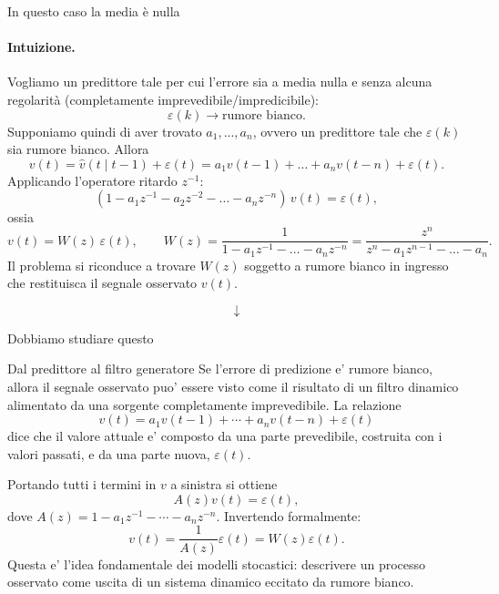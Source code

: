 \documentclass[11pt,a4paper]{article}
\begin{document}
In questo caso la media è nulla


\paragraph{Intuizione.} Vogliamo un predittore tale per cui l'errore sia a media nulla e senza alcuna regolarità (completamente imprevedibile/impredicibile):
\[
\varepsilon(k)\longrightarrow \text{rumore bianco}.
\]
Supponiamo quindi di aver trovato $a_1,...,a_n$, ovvero un predittore tale che $\varepsilon(k)$ sia rumore bianco. Allora
\[
v(t)=\hat v(t\mid t-1)+\varepsilon(t)=a_1 v(t-1)+\dots+a_n v(t-n)+\varepsilon(t).
\]
Applicando l'operatore ritardo $z^{-1}$:
\[
(1-a_1 z^{-1}-a_2 z^{-2}-\dots-a_n z^{-n})\,v(t)=\varepsilon(t),
\]
ossia
\[
v(t)=W(z)\,\varepsilon(t),\qquad W(z)=\frac{1}{1-a_1 z^{-1}-\dots-a_n z^{-n}}=\frac{z^n}{z^n-a_1 z^{n-1}-\dots-a_n}.
\]
Il problema si riconduce a trovare $W(z)$ soggetto a rumore bianco in ingresso che restituisca il segnale osservato $v(t)$.

\begin{center}
\end{center}
\vspace{-0.8em}
\[
\downarrow
\]
\begin{center}
 Dobbiamo studiare questo  
\end{center}

\begin{spiegazione}{Dal predittore al filtro generatore}
Se l'errore di predizione e' rumore bianco, allora il segnale osservato puo' essere visto come il risultato di un filtro dinamico alimentato da una sorgente completamente imprevedibile. La relazione
\[
v(t)=a_1v(t-1)+\cdots+a_nv(t-n)+\varepsilon(t)
\]
dice che il valore attuale e' composto da una parte prevedibile, costruita con i valori passati, e da una parte nuova, $\varepsilon(t)$.

Portando tutti i termini in $v$ a sinistra si ottiene
\[
A(z)v(t)=\varepsilon(t),
\]
dove $A(z)=1-a_1z^{-1}-\cdots-a_nz^{-n}$. Invertendo formalmente:
\[
v(t)=\frac{1}{A(z)}\varepsilon(t)=W(z)\varepsilon(t).
\]
Questa e' l'idea fondamentale dei modelli stocastici: descrivere un processo osservato come uscita di un sistema dinamico eccitato da rumore bianco.
\end{spiegazione}
\end{document}
